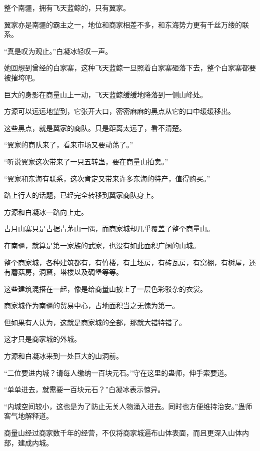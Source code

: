\begin{this_body}
整个南疆，拥有飞天蓝鲸的，只有翼家。

翼家亦是南疆的霸主之一，地位和商家相差不多，和东海势力更有千丝万缕的联系。

“真是叹为观止。”白凝冰轻叹一声。

她回想到曾经的白家寨，这种飞天蓝鲸一旦照着白家寨砸落下去，整个白家寨都要被摧垮吧。

巨大的身影在商量山上一动，飞天蓝鲸缓缓地降落到一侧山峰处。

方源可以远远地望到，它张开大口，密密麻麻的黑点从它的口中缓缓移出。

这些黑点，就是翼家的商队。只是距离太远了，看不清楚。

“翼家的商队来了，看来市场又要动荡了。”

“听说翼家这次带来了一只五转蛊，要在商量山拍卖。”

“翼家和东海有联系，这次肯定又带来许多东海的特产，值得购买。”

路上行人的话题，已经完全转移到翼家商队身上。

方源和白凝冰一路向上走。

古月山寨只是占据青茅山一隅，而商家城却几乎覆盖了整个商量山。

在南疆，就算是第一家族的武家，也没有如此面积广阔的山城。

整个商家城，各种建筑都有，有竹楼，有土坯房，有砖瓦房，有窝棚，有树屋，还有蘑菇房，洞窟，塔楼以及碉堡等等。

这些建筑混搭在一起，像是给商量山披上了一层色彩驳杂的衣裳。

商家城作为南疆的贸易中心，占地面积当之无愧为第一。

但如果有人认为，这就是商家城的全部，那就大错特错了。

这才只是商家城的外城。

方源和白凝冰来到一处巨大的山洞前。

“二位要进内城？请每人缴纳一百块元石。”守在这里的蛊师，伸手索要道。

“单单进去，就需要一百块元石？”白凝冰表示惊异。

“内城空间较小，这也是为了防止无关人物涌入进去。同时也方便维持治安。”蛊师客气地解释道。

商量山经过商家数千年的经营，不仅将商家城遍布山体表面，而且更深入山体内部，建成内城。

\end{this_body}

